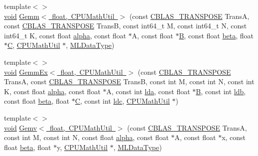 \begin{DoxyCompactItemize}
{\footnotesize template$<$$>$ }\\\mbox{\hyperlink{mlasi_8h_a88f941d423cb2a819b70a1358982b1a6}{void}} \mbox{\hyperlink{namespaceonnxruntime_1_1math_abc3e8a69d5980bcf568ca96dc41c7bc1}{Gemm$<$ float, C\+P\+U\+Math\+Util $>$}} (const \mbox{\hyperlink{cblas_8h_a44dfaddb823648755b110dbad849c5a9}{C\+B\+L\+A\+S\+\_\+\+T\+R\+A\+N\+S\+P\+O\+SE}} TransA, const \mbox{\hyperlink{cblas_8h_a44dfaddb823648755b110dbad849c5a9}{C\+B\+L\+A\+S\+\_\+\+T\+R\+A\+N\+S\+P\+O\+SE}} TransB, const int64\+\_\+t M, const int64\+\_\+t N, const int64\+\_\+t K, const float \mbox{\hyperlink{mlasi_8h_a1763355f32e1812e5cb3a0080e7cca12}{alpha}}, const float $\ast$A, const float $\ast$\mbox{\hyperlink{mlasi_8h_a472f4360dfbf830e5135980ff43484b9}{B}}, const float \mbox{\hyperlink{mlasi_8h_a5fd37d216981b4cd9a19e29b5acd48d4}{beta}}, float $\ast$\mbox{\hyperlink{mlasi_8h_a5693f8b3559ce97985de5239fdcf6006}{C}}, \mbox{\hyperlink{classonnxruntime_1_1CPUMathUtil}{C\+P\+U\+Math\+Util}} $\ast$, \mbox{\hyperlink{namespaceonnxruntime_ad77d0a6e838ec7da5dc35fed5ee66b49}{M\+L\+Data\+Type}})
\item 
{\footnotesize template$<$$>$ }\\\mbox{\hyperlink{mlasi_8h_a88f941d423cb2a819b70a1358982b1a6}{void}} \mbox{\hyperlink{namespaceonnxruntime_1_1math_ae7ad1df8b62f3b7c4944a12d7c9a5e53}{Gemm\+Ex$<$ float, C\+P\+U\+Math\+Util $>$}} (const \mbox{\hyperlink{cblas_8h_a44dfaddb823648755b110dbad849c5a9}{C\+B\+L\+A\+S\+\_\+\+T\+R\+A\+N\+S\+P\+O\+SE}} TransA, const \mbox{\hyperlink{cblas_8h_a44dfaddb823648755b110dbad849c5a9}{C\+B\+L\+A\+S\+\_\+\+T\+R\+A\+N\+S\+P\+O\+SE}} TransB, const int M, const int N, const int K, const float \mbox{\hyperlink{mlasi_8h_a1763355f32e1812e5cb3a0080e7cca12}{alpha}}, const float $\ast$A, const int \mbox{\hyperlink{mlasi_8h_a38dd84f17dbd65aaf9f618e5c3ec496f}{lda}}, const float $\ast$\mbox{\hyperlink{mlasi_8h_a472f4360dfbf830e5135980ff43484b9}{B}}, const int \mbox{\hyperlink{mlasi_8h_a4431ce68ee01016a66896cedd34a57db}{ldb}}, const float \mbox{\hyperlink{mlasi_8h_a5fd37d216981b4cd9a19e29b5acd48d4}{beta}}, float $\ast$\mbox{\hyperlink{mlasi_8h_a5693f8b3559ce97985de5239fdcf6006}{C}}, const int \mbox{\hyperlink{mlasi_8h_ab55e28f894e92d01896d7dfc5e3cfa86}{ldc}}, \mbox{\hyperlink{classonnxruntime_1_1CPUMathUtil}{C\+P\+U\+Math\+Util}} $\ast$)
\item 
{\footnotesize template$<$$>$ }\\\mbox{\hyperlink{mlasi_8h_a88f941d423cb2a819b70a1358982b1a6}{void}} \mbox{\hyperlink{namespaceonnxruntime_1_1math_a8fecd4da59b1aaf9bb4fc371a40037b7}{Gemv$<$ float, C\+P\+U\+Math\+Util $>$}} (const \mbox{\hyperlink{cblas_8h_a44dfaddb823648755b110dbad849c5a9}{C\+B\+L\+A\+S\+\_\+\+T\+R\+A\+N\+S\+P\+O\+SE}} TransA, const int M, const int N, const float \mbox{\hyperlink{mlasi_8h_a1763355f32e1812e5cb3a0080e7cca12}{alpha}}, const float $\ast$A, const float $\ast$x, const float \mbox{\hyperlink{mlasi_8h_a5fd37d216981b4cd9a19e29b5acd48d4}{beta}}, float $\ast$y, \mbox{\hyperlink{classonnxruntime_1_1CPUMathUtil}{C\+P\+U\+Math\+Util}} $\ast$, \mbox{\hyperlink{namespaceonnxruntime_ad77d0a6e838ec7da5dc35fed5ee66b49}{M\+L\+Data\+Type}})

\end{DoxyCompactItemize}
